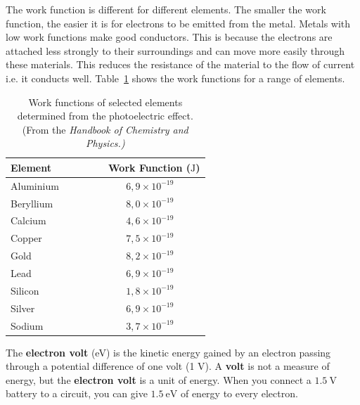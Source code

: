 The work function is different for different elements. The smaller the work function, the easier it is for electrons to be emitted from the metal. Metals with low work functions make good conductors. This is because the electrons are attached less strongly to their surroundings and can move more easily through these materials. This reduces the resistance of the material to the flow of current i.e. it conducts well. Table~\ref{tab:work_fun} shows the work functions for a range of elements.

\begin{table}[!h]
\begin{center}
\begin{tabular}{lc}
\hline
Element ~~~ & ~~~~ Work Function ($\mathrm{J}$) \\
\hline
Aluminium & ~~~ $6,9\times 10^{-19} $ \\
Beryllium & ~~~ $8,0 \times 10^{-19} $ \\
Calcium & ~~~ $4,6 \times 10^{-19} $ \\
Copper & ~~~ $7,5 \times 10^{-19}  $ \\
Gold & ~~~ $8,2 \times 10^{-19}  $ \\
Lead & ~~~ $6,9 \times 10^{-19}  $ \\
Silicon & ~~~ $1,8 \times 10^{-19}  $ \\
Silver & ~~~ $6,9 \times 10^{-19}  $ \\
Sodium & ~~~ $3,7 \times 10^{-19} $ \\
\hline
\end{tabular}
\caption{{ Work functions of selected elements determined from the photoelectric effect. (From the \it{Handbook of Chemistry and Physics.})}}
\label{tab:work_fun}
\end{center}
\end{table}


 

\begin{IFact}
{The \textbf{electron volt} (eV) is the kinetic energy gained by an electron  passing through a potential difference of one volt (1 $\mathrm{V}$). A \textbf{volt} is not a measure of energy, but the \textbf{electron volt} is a unit of energy. When you connect a $1.5 ~\mathrm{V}$ battery to a circuit, you can give $1.5~\mathrm{eV}$ of energy to every electron.}
\end{IFact}

